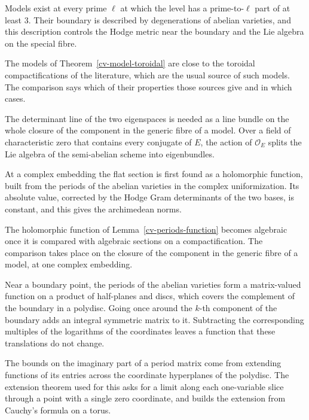 Models exist at every prime $\ell$ at which the level has a prime-to-$\ell$ part of at least $3$.
Their boundary is described by degenerations of abelian varieties, and this description controls the
Hodge metric near the boundary and the Lie algebra on the special fibre.

The models of Theorem~\ref{cv-model-toroidal} are close to the toroidal compactifications of the
literature, which are the usual source of such models. The comparison says which of their properties
those sources give and in which cases.

The determinant line of the two eigenspaces is needed as a line bundle on the whole closure of the
component in the generic fibre of a model. Over a field of characteristic zero that contains every
conjugate of $E$, the action of $\mathcal O_E$ splits the Lie algebra of the semi-abelian scheme into
eigenbundles.

At a complex embedding the flat section is first found as a holomorphic function, built from the
periods of the abelian varieties in the complex uniformization. Its absolute value, corrected by the
Hodge Gram determinants of the two bases, is constant, and this gives the archimedean norms.

The holomorphic function of Lemma~\ref{cv-periods-function} becomes algebraic once it is compared
with algebraic sections on a compactification. The comparison takes place on the closure of the
component in the generic fibre of a model, at one complex embedding.

Near a boundary point, the periods of the abelian varieties form a matrix-valued function on a
product of half-planes and discs, which covers the complement of the boundary in a polydisc. Going
once around the $k$-th component of the boundary adds an integral symmetric matrix to it.
Subtracting the corresponding multiples of the logarithms of the coordinates leaves a function that
these translations do not change.

The bounds on the imaginary part of a period matrix come from extending functions of its entries
across the coordinate hyperplanes of the polydisc. The extension theorem used for this asks for a
limit along each one-variable slice through a point with a single zero coordinate, and builds the
extension from Cauchy's formula on a torus.

